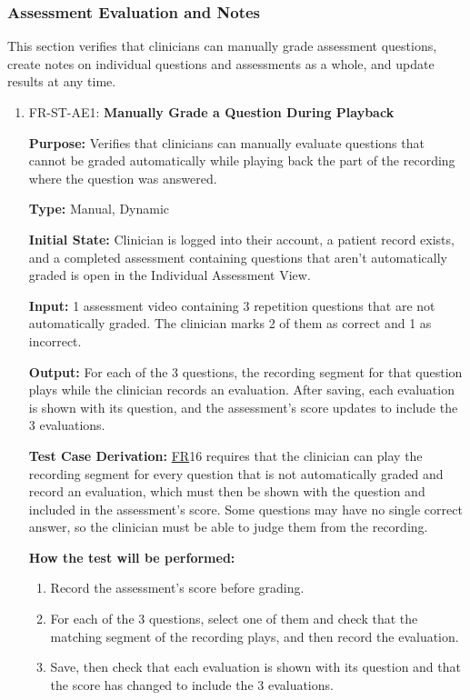 \documentclass[12pt, titlepage]{article}
\newcommand{\srsfr}[1]{\href{https://github.com/Nour-Fawaz/MacaBoca/blob/main/pdfs/SRS/SRS.pdf}{FR}}
\renewcommand{\_}{\oldunderscore\allowbreak}
\begin{document}
\subsubsection{Assessment Evaluation and Notes}
This section verifies that clinicians can manually grade assessment questions,
create notes on individual questions and assessments as a whole, and update 
results at any time.
\begin{enumerate}
  \item FR-ST-AE1: \textbf{Manually Grade a Question During Playback\\}
  \begin{mdframed}[linewidth=0.5mm]
      \textbf{Purpose:} Verifies that clinicians can manually evaluate questions that cannot be graded automatically while playing back the part of the recording where the question was answered. \par
      \textbf{Type:} Manual, Dynamic \par
      \textbf{Initial State:} Clinician is logged into their account, a patient record exists, and a completed assessment containing questions that aren't automatically graded is open in the Individual Assessment View. \par
      \textbf{Input:} 1 assessment video containing 3 repetition questions that are not automatically graded. The clinician marks 2 of them as correct and 1 as incorrect. \par
      \textbf{Output:} For each of the 3 questions, the recording segment for that question plays while the clinician records an evaluation. After saving, each evaluation is shown with its question, and the assessment's score updates to include the 3 evaluations. \par
      \textbf{Test Case Derivation:} \srsfr*{16} requires that the clinician can play the recording segment for every question that is not automatically graded and record an evaluation, which must then be shown with the question and included in the assessment's score. Some questions may have no single correct answer, so the clinician must be able to judge them from the recording. \par
      \textbf{How the test will be performed:}
      \begin{enumerate}
        \item[1.] Record the assessment's score before grading.
        \item[2.] For each of the 3 questions, select one of them and check that the matching segment of the recording plays, and then record the evaluation.
        \item[3.] Save, then check that each evaluation is shown with its question and that the score has changed to include the 3 evaluations.
      \end{enumerate}
  \end{mdframed}


\end{enumerate}
\end{document}
